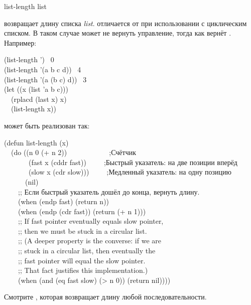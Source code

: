 \begin{defun}[Функция]
list-length list

 возвращает длину списка \emph{list}.
 отличается от  при использовании с циклическим
списком. В таком случае  может не вернуть управление, тогда как
 вернёт {\nil}.
Например:
\begin{lisp}
(list-length '{\emptylist}) \EV\ 0 \\
(list-length '(a b c d)) \EV\ 4 \\
(list-length '(a (b c) d)) \EV\ 3 \\
(let ((x (list 'a b c))) \\
~~(rplacd (last x) x) \\
~~(list-length x)) \EV\ {\nil}
\end{lisp}
 может быть реализован так:
\begin{lisp}
(defun list-length (x) \\
~~(do ((n 0 (+ n 2))~~~~~~~~~~~~;\textrm{Счётчик} \\
~~~~~~~(fast x (cddr fast))~~~~~;\textrm{Быстрый указатель: на две позиции вперёд} \\
~~~~~~~(slow x (cdr slow)))~~~~~;\textrm{Медленный указатель: на одну позицию} \\
~~~~~~(nil) \\
~~~~;; Если быстрый указатель дошёл до конца, вернуть длину. \\
~~~~(when (endp fast) (return n)) \\
~~~~(when (endp (cdr fast)) (return (+ n 1))) \\
~~~~;; If fast pointer eventually equals slow pointer, \\
~~~~;;  then we must be stuck in a circular list. \\
~~~~;; (A deeper property is the converse: if we are \\
~~~~;;  stuck in a circular list, then eventually the \\
~~~~;;  fast pointer will equal the slow pointer. \\
~~~~;;  That fact justifies this implementation.) \\
~~~~(when (and (eq fast slow) (> n 0)) (return nil))))
\end{lisp}
Смотрите , которая возвращает длину любой последовательности.
\end{defun}

